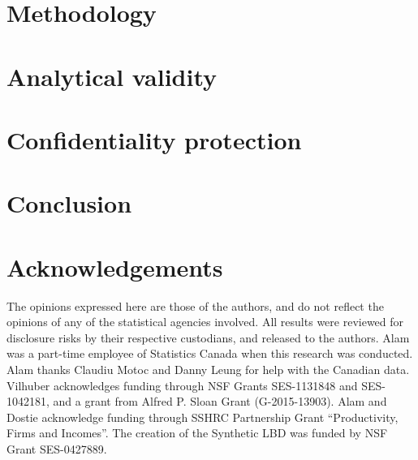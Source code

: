 \documentclass[10pt,twoside]{article}
\begin{document}
\section{Methodology}
\label{sec:methodology}


\section{Analytical validity}
\label{sec:analytic}


\section{Confidentiality protection}
\label{sec:confidentiality}


\section{Conclusion}
\label{sec:conclusion}



\section*{Acknowledgements}

The opinions expressed here are those of the authors, and do not reflect the opinions of any of the statistical agencies involved. All results were reviewed for disclosure risks by their respective custodians, and released to the authors.  Alam was a part-time employee of Statistics Canada when this research was conducted.  Alam thanks Claudiu Motoc and Danny Leung for help with the Canadian data.  Vilhuber acknowledges funding through NSF Grants SES-1131848 and SES-1042181, and a grant from Alfred P. Sloan Grant (G-2015-13903). Alam and Dostie acknowledge funding through SSHRC Partnership Grant ``Productivity, Firms and Incomes''. The creation of the Synthetic LBD  was funded by NSF Grant SES-0427889.


\printbibliography


\newpage



\end{document}
